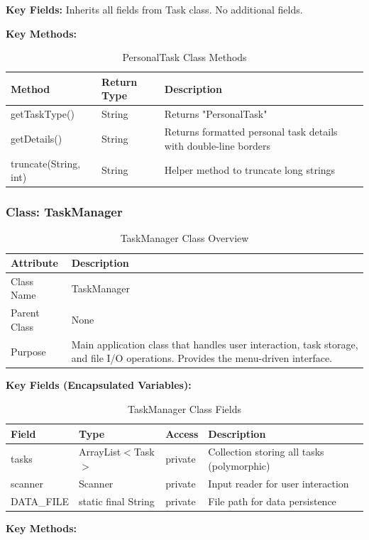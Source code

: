 \documentclass[12pt,a4paper]{article}
\begin{document}
\textbf{Key Fields:} Inherits all fields from Task class. No additional fields.

\textbf{Key Methods:}

\begin{table}[H]
\centering
\begin{tabular}{|l|l|p{7cm}|}
\hline
\textbf{Method} & \textbf{Return Type} & \textbf{Description} \\
\hline
getTaskType() & String & Returns "PersonalTask" \\
\hline
getDetails() & String & Returns formatted personal task details with double-line borders \\
\hline
truncate(String, int) & String & Helper method to truncate long strings \\
\hline
\end{tabular}
\caption{PersonalTask Class Methods}
\end{table}

\subsubsection{Class: TaskManager}

\begin{table}[H]
\centering
\begin{tabular}{|l|p{10cm}|}
\hline
\textbf{Attribute} & \textbf{Description} \\
\hline
Class Name & TaskManager \\
\hline
Parent Class & None \\
\hline
Purpose & Main application class that handles user interaction, task storage, and file I/O operations. Provides the menu-driven interface. \\
\hline
\end{tabular}
\caption{TaskManager Class Overview}
\end{table}

\textbf{Key Fields (Encapsulated Variables):}

\begin{table}[H]
\centering
\begin{tabular}{|l|l|l|p{5cm}|}
\hline
\textbf{Field} & \textbf{Type} & \textbf{Access} & \textbf{Description} \\
\hline
tasks & ArrayList$<$Task$>$ & private & Collection storing all tasks (polymorphic) \\
\hline
scanner & Scanner & private & Input reader for user interaction \\
\hline
DATA\_FILE & static final String & private & File path for data persistence \\
\hline
\end{tabular}
\caption{TaskManager Class Fields}
\end{table}
\newpage
\textbf{Key Methods:}
\end{document}
